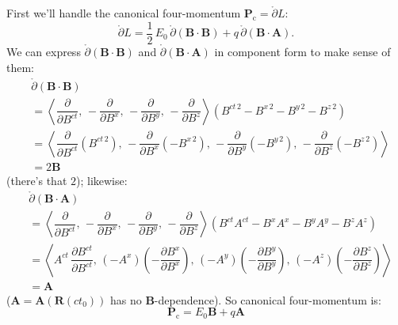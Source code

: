 \documentclass[12pt]{article}
\renewcommand{\vv}[1]{\mathbf{#1}}
\begin{document}
First we'll handle the canonical four-momentum $\vv P _\textrm{c} = \mathring{\partialup} L$:
\begin{equation*}
\mathring{\partialup} L =  \dfrac{1}{2} \, E_0 \, \mathring{\partialup} (\vv B \cdot \vv B) + q \, \mathring{\partialup} (\vv B \cdot \vv A) .
\end{equation*}
We can express $\mathring{\partialup} (\vv B \cdot \vv B)$ and $\mathring{\partialup} (\vv B \cdot \vv A)$ in component form to make sense of them:
\begin{equation*}
\begin{split}
&\mathring{\partialup} (\vv B \cdot \vv B) \\[2pt]
&= \left \langle \dfrac{\partial}{\partial B^{ct}} , \,  - \dfrac{\partial}{\partial B^x} , \, - \dfrac{\partial}{\partial B^y} , \, - \dfrac{\partial}{\partial B^z} \right \rangle \left( B^{ct \, 2} - B^{x \, 2} - B^{y \, 2} - B^{z \, 2} \right) \\[3pt]
&= \left \langle \dfrac{\partial}{\partial B^{ct}} \left( B^{ct \, 2} \right) , \, - \dfrac{\partial}{\partial B^x} \left( - B^{x \, 2} \right) , \, - \dfrac{\partial}{\partial B^y} \left( - B^{y \, 2} \right)  , \, - \dfrac{\partial}{\partial B^z} \left( - B^{z \, 2} \right)  \right \rangle \\[2pt]
&= 2 \vv B
\end{split}
\end{equation*}
(there's that $2$); likewise:
\begin{equation*}
\begin{split}
&\mathring{\partialup} (\vv B \cdot \vv A) \\[2pt]
&= \left \langle \dfrac{\partial}{\partial B^{ct}} , \,  - \dfrac{\partial}{\partial B^x} , \, - \dfrac{\partial}{\partial B^y} , \, - \dfrac{\partial}{\partial B^z} \right \rangle \left( B^{ct} A^{ct} - B^x A^x - B^y A^y - B^z A^z \right) \\[3pt]
&= \left \langle A^{ct} \, \dfrac{\partial B^{ct}}{\partial B^{ct}} , \,  (- A^x) \left( - \dfrac{\partial B^x}{\partial B^x} \right) , \, (-A^y) \left( - \dfrac{\partial B^y}{\partial B^y} \right) , \, (-A^z) \left( - \dfrac{\partial B^z}{\partial B^z} \right) \right \rangle \\[2pt]
&= \vv A 
\end{split}
\end{equation*}
($\vv A = \vv A(\vv R(ct_0))$ has no $\vv B$-dependence). So canonical four-momentum is:
\begin{equation*}
\vv P _\textrm{c} =  E_0 \vv B + q \vv A
\end{equation*}
\end{document}
